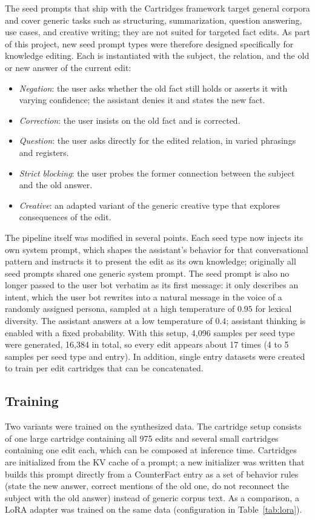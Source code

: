 \documentclass[10pt,a4paper]{article}
\begin{document}
The seed prompts that ship with the Cartridges framework target general corpora and
cover generic tasks such as structuring, summarization, question answering, use cases,
and creative writing; they are not suited for targeted fact edits. As part of this
project, new seed prompt types were therefore designed specifically for knowledge
editing. Each is instantiated with the subject, the relation, and the old or new answer
of the current edit:
\begin{itemize}\itemsep2pt
  \item \emph{Negation}: the user asks whether the old fact still holds or asserts it
        with varying confidence; the assistant denies it and states the new fact.
  \item \emph{Correction}: the user insists on the old fact and is corrected.
  \item \emph{Question}: the user asks directly for the edited relation, in varied
        phrasings and registers.
  \item \emph{Strict blocking}: the user probes the former connection between the
        subject and the old answer.
  \item \emph{Creative}: an adapted variant of the generic creative type that explores
        consequences of the edit.
\end{itemize}
The pipeline itself was modified in several points. Each seed type now injects its own
system prompt, which shapes the assistant's behavior for that conversational pattern and
instructs it to present the edit as its own knowledge; originally all seed prompts
shared one generic system prompt. The seed prompt is also no longer passed to the user
bot verbatim as its first message: it only describes an intent, which the user bot
rewrites into a natural message in the voice of a randomly assigned persona, sampled at
a high temperature of $0.95$ for lexical diversity. The assistant answers at a low
temperature of $0.4$; assistant thinking is enabled with a fixed probability. With this setup, 4{,}096 samples per seed type were generated,
16{,}384 in total, so every edit appears about 17 times (4 to 5 samples per seed type
and entry). In addition, single entry datasets were created to train per edit cartridges
that can be concatenated.

\subsection{Training}
Two variants were trained on the synthesized data. The cartridge setup consists of one
large cartridge containing all 975 edits and several small cartridges containing one edit
each, which can be composed at inference time. Cartridges are initialized from the KV
cache of a prompt; a new initializer was written that builds this prompt directly from a
CounterFact entry as a set of behavior rules (state the new answer, correct mentions of
the old one, do not reconnect the subject with the old answer) instead of generic corpus
text. As a comparison, a LoRA adapter
\citep{hu2021loralowrankadaptationlarge} was trained on the same data (configuration in Table~\ref{tab:lora}).
\end{document}
